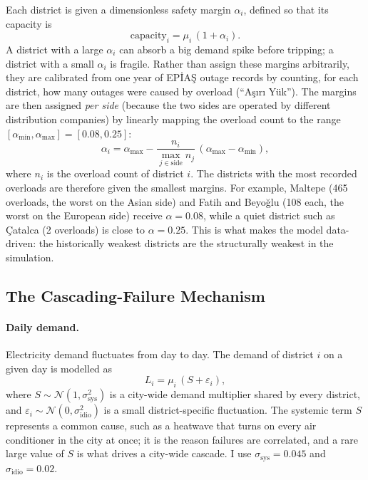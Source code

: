 \documentclass[11pt,a4paper]{article}
\begin{document}
Each district is given a dimensionless safety margin $\alpha_i$, defined so that
its capacity is
\begin{equation}
    \text{capacity}_i = \mu_i \, (1 + \alpha_i).
\end{equation}
A district with a large $\alpha_i$ can absorb a big demand spike before tripping;
a district with a small $\alpha_i$ is fragile. Rather than assign these margins
arbitrarily, they are calibrated from one year of EPİAŞ outage records by
counting, for each district, how many outages were caused by overload
(``Aşırı Yük''). The margins are then assigned \emph{per side} (because the two
sides are operated by different distribution companies) by linearly mapping the
overload count to the range $[\alpha_{\min}, \alpha_{\max}] = [0.08, 0.25]$:
\begin{equation}
    \alpha_i = \alpha_{\max} - \frac{n_i}{\max_{j \in \text{side}} n_j}\,(\alpha_{\max} - \alpha_{\min}),
\end{equation}
where $n_i$ is the overload count of district $i$. The districts with the most
recorded overloads are therefore given the smallest margins. For example,
Maltepe (465 overloads, the worst on the Asian side) and Fatih and Beyoğlu (108
each, the worst on the European side) receive $\alpha = 0.08$, while a quiet
district such as Çatalca (2 overloads) is close to $\alpha = 0.25$. This is what
makes the model data-driven: the historically weakest districts are the
structurally weakest in the simulation.

\subsection{The Cascading-Failure Mechanism}

\paragraph{Daily demand.}
Electricity demand fluctuates from day to day. The demand of district $i$ on a
given day is modelled as
\begin{equation}
    L_i = \mu_i \, (S + \varepsilon_i),
\end{equation}
where $S \sim \mathcal{N}(1, \sigma_{\text{sys}}^2)$ is a
city-wide demand multiplier shared by every district, and
$\varepsilon_i \sim \mathcal{N}(0, \sigma_{\text{idio}}^2)$ is a small
district-specific fluctuation. The systemic term $S$ represents a common cause,
such as a heatwave that turns on every air conditioner in the city at once; it is
the reason failures are correlated, and a rare large value of $S$ is what drives
a city-wide cascade. I use $\sigma_{\text{sys}} = 0.045$ and
$\sigma_{\text{idio}} = 0.02$.
\end{document}
